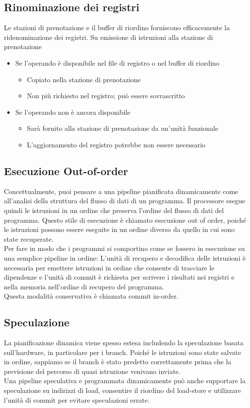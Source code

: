 \documentclass[12pt,a4paper]{article}
\begin{document}
\subsection{Rinominazione dei registri}
Le stazioni di prenotazione e il buffer di riordino forniscono efficacemente la ridenominazione dei registri. Su emissione di istruzioni alla stazione di prenotazione
\begin{itemize}
\item Se l'operando è disponibile nel file di registro o nel buffer di riordino
\begin{itemize}
\item Copiato nella stazione di prenotazione
\item Non più richiesto nel registro; può essere sovrascritto
\end{itemize}
\item Se l'operando non è ancora disponibile
\begin{itemize}
\item Sarà fornito alla stazione di prenotazione da un'unità funzionale
\item L'aggiornamento del registro potrebbe non essere necessario
\end{itemize}
\end{itemize}

\subsection{Esecuzione Out-of-order}
Concettualmente, puoi pensare a una pipeline pianificata dinamicamente come all'analisi della struttura del flusso di dati di un programma. Il processore esegue quindi le istruzioni in un ordine che preserva l'ordine del flusso di dati del programma. Questo stile di esecuzione è chiamato esecuzione out of order, poiché le istruzioni possono essere eseguite in un ordine diverso da quello in cui sono state recuperate.\\
Per fare in modo che i programmi si comportino come se fossero in esecuzione su una semplice pipeline in ordine:
L'unità di recupero e decodifica delle istruzioni è necessaria per emettere istruzioni in ordine che consente di tracciare le dipendenze e l'unità di commit è richiesta per scrivere i risultati nei registri e nella memoria nell'ordine di recupero del programma.\\
Questa modalità conservativa è chiamata commit in-order.

\subsection{Speculazione}
La pianificazione dinamica viene spesso estesa includendo la speculazione basata sull'hardware, in particolare per i branch. Poiché le istruzioni sono state salvate in ordine, sappiamo se il branch è stato predetto correttamente prima che la previsione del percorso di quasi istruzione venivano inviate.\\
Una pipeline speculativa e programmata dinamicamente può anche supportare la speculazione su indirizzi di load, consentire il riordino del load-store e utilizzare l'unità di commit per evitare speculazioni errate.
\end{document}
